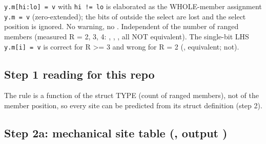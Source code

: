 \begin{record}

\texttt{y.\allowbreak{}m[hi:\allowbreak{}lo]\ =\allowbreak{}\ v} with
\texttt{hi\ !=\allowbreak{}\ lo} is elaborated as the WHOLE-member
assignment \texttt{y.\allowbreak{}m\ =\allowbreak{}\ v} (zero-extended);
the bits of  outside the select are lost and the select position
is ignored. No warning, no . Independent of the number of ranged
members (measured R = 2, 3, 4: , ,
,  all NOT equivalent). The single-bit LHS
\texttt{y.\allowbreak{}m[i]\ =\allowbreak{}\ v} is correct for R
\textgreater= 3 and wrong for R = 2 (,
 equivalent;  not).

\end{record}

\subsection{Step 1 reading for this repo}\label{cr:defect:synlig-struct-select-ainf:step-1-reading-for-this-repo}

\begin{record}

The rule is a function of the struct TYPE (count of ranged members), not
of the member position, so every site can be predicted from its struct
definition (step 2).

\end{record}

\subsection{\texorpdfstring{Step 2a: mechanical site table
(, output
)}{Step 2a: mechanical site table (, output )}}\label{cr:defect:synlig-struct-select-ainf:step-2a-mechanical-site-table-toolsverifstruct-selectsitetablepy-output-resultssitetabletxt}

